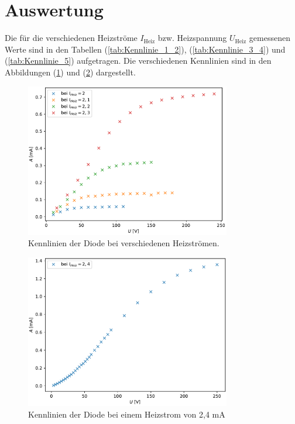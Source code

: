 \section{Auswertung}
\label{sec:Auswertung}

Die für die verschiedenen Heizströme $I_{\text{Heiz}}$ bzw. Heizspannung $U_{\text{Heiz}}$ gemessenen Werte sind in den Tabellen (\ref{tab:Kennlinie_1_2}),
(\ref{tab:Kennlinie_3_4}) und (\ref{tab:Kennlinie_5}) aufgetragen. Die verschiedenen Kennlinien sind in den Abbildungen (\ref{fig:plot_1}) und (\ref{fig:plot_2}) dargestellt. 

\begin{figure}
    \centering
    \includegraphics[width=0.8\textwidth]{plot_1.pdf}
    \caption{Kennlinien der Diode bei verschiedenen Heizströmen.}
    \label{fig:plot_1}
\end{figure}
\begin{figure}
      \centering
      \includegraphics[width=0.8\textwidth]{plot_2.pdf}
      \caption{Kennlinien der Diode bei einem Heizstrom von 2,4 mA}
      \label{fig:plot_2}
\end{figure}

